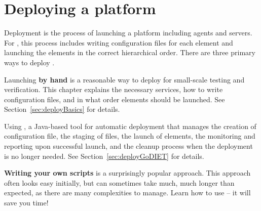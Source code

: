 
\chapter{Deploying a \diet platform}
\label{ch:deploying}

Deployment is the process of launching a \diet platform including agents and
servers. For \diet, this process includes writing configuration files for each
element and launching the elements in the correct hierarchical order. There are
three primary ways to deploy \diet.

Launching \textbf{by hand} is a reasonable way to deploy \diet for small-scale
testing and verification. This chapter explains the necessary services, how to
write \diet configuration files, and in what order \diet elements should be
launched. See Section~\ref{sec:deployBasics} for details.

Using \textbf{\godiet}, a Java-based tool for automatic \diet deployment that
manages the creation of configuration file, the staging of files, the launch of elements,
the monitoring and reporting upon successful launch, and the cleanup process when the \diet
deployment is no longer needed. See Section~\ref{sec:deployGoDIET} for
details.

\textbf{Writing your own scripts} is a surprisingly popular approach. This
approach often looks easy initially, but can sometimes take much, much longer
than expected, as there are many complexities to manage. Learn how to use \godiet -- it
will save you time!




